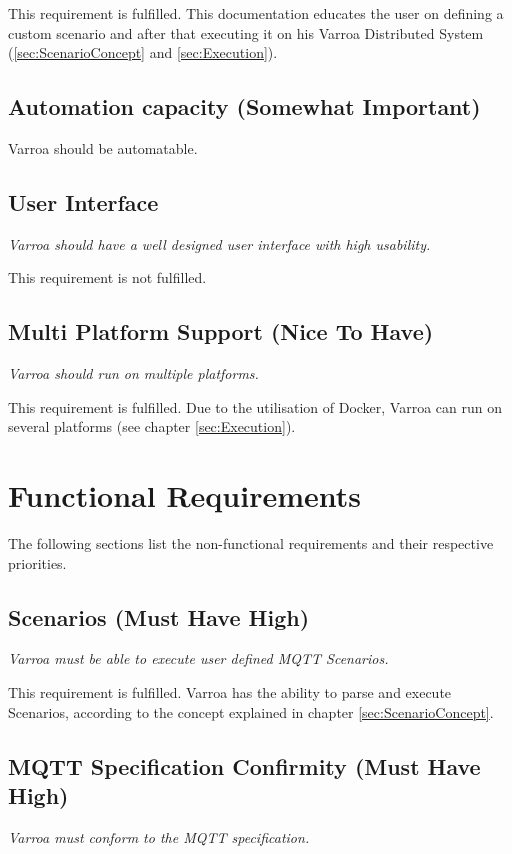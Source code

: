 This requirement is fulfilled. This documentation educates the user on defining a custom scenario and after that executing it on his Varroa Distributed System (\ref{sec:ScenarioConcept} and \ref{sec:Execution}).

\subsection{Automation capacity (Somewhat Important)} 
Varroa should be automatable.


\subsection{User Interface}
\emph{Varroa should have a well designed user interface with high usability.}

This requirement is not fulfilled.


\subsection{Multi Platform Support (Nice To Have)}
\emph{Varroa should run on multiple platforms.}

This requirement is fulfilled.
Due to the utilisation of Docker, Varroa can run on several platforms (see chapter \ref{sec:Execution}).

\section{Functional Requirements}
The following sections list the non-functional requirements and their respective priorities.

\subsection{Scenarios (Must Have High)}
\emph{Varroa must be able to execute user defined MQTT Scenarios.}

This requirement is fulfilled.
Varroa has the ability to parse and execute Scenarios, according to the concept explained in chapter \ref{sec:ScenarioConcept}.

\subsection{MQTT Specification Confirmity (Must Have High)}
\emph{Varroa must conform to the MQTT specification.}

